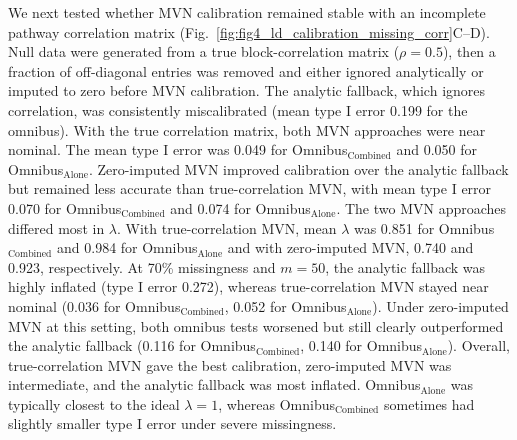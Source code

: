 \documentclass[unnumsec,webpdf,contemporary,large]{oup-authoring-template}%
\theoremstyle{thmstyleone}%
\theoremstyle{thmstyletwo}%
\theoremstyle{thmstylethree}%
\begin{document}
We next tested whether MVN calibration remained stable with an incomplete pathway correlation matrix (Fig.~\ref{fig:fig4_ld_calibration_missing_corr}C--D). Null data were generated from a true block-correlation matrix (\(\rho=0.5\)), then a fraction of off-diagonal entries was removed and either ignored analytically or imputed to zero before MVN calibration. The analytic fallback, which ignores correlation, was consistently miscalibrated (mean type I error 0.199 for the omnibus). With the true correlation matrix, both MVN approaches were near nominal. The mean type I error was 0.049 for Omnibus\(_\text{Combined}\) and 0.050 for Omnibus\(_\text{Alone}\). Zero-imputed MVN improved calibration over the analytic fallback but remained less accurate than true-correlation MVN, with mean type I error 0.070 for Omnibus\(_\text{Combined}\) and 0.074 for Omnibus\(_\text{Alone}\). The two MVN approaches differed most in \(\lambda\). With true-correlation MVN, mean \(\lambda\) was 0.851 for Omnibus\(_\text{Combined}\) and 0.984 for Omnibus\(_\text{Alone}\) and with zero-imputed MVN, 0.740 and 0.923, respectively. At 70\% missingness and \(m=50\), the analytic fallback was highly inflated (type I error 0.272), whereas true-correlation MVN stayed near nominal (0.036 for Omnibus\(_\text{Combined}\), 0.052 for Omnibus\(_\text{Alone}\)). Under zero-imputed MVN at this setting, both omnibus tests worsened but still clearly outperformed the analytic fallback (0.116 for Omnibus\(_\text{Combined}\), 0.140 for Omnibus\(_\text{Alone}\)). Overall, true-correlation MVN gave the best calibration, zero-imputed MVN was intermediate, and the analytic fallback was most inflated. Omnibus\(_\text{Alone}\) was typically closest to the ideal \(\lambda=1\), whereas Omnibus\(_\text{Combined}\) sometimes had slightly smaller type I error under severe missingness.
\end{document}

